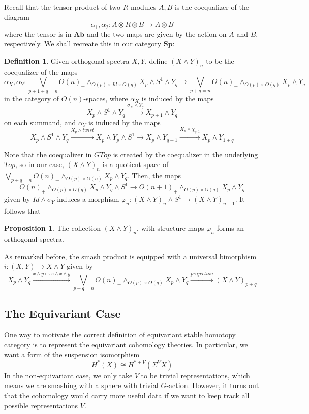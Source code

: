 \documentclass{article}
\theoremstyle{definition}
\theoremstyle{definition}
\newtheorem{definition}{Definition}[theorem]
\theoremstyle{definition}
\theoremstyle{definition}
\newtheorem{proposition}{Proposition}[theorem]
\theoremstyle{definition}
\theoremstyle{definition}
\theoremstyle{definition}
\begin{document}
Recall that the tensor product of two $R$-modules $A,B$ is the coequalizer of the diagram 
\[\alpha_1,\alpha_2: A\otimes R\otimes B\to A\otimes B\]
where the tensor is in $\textbf{Ab}$ and the two maps are given by the action on $A$ and $B$, respectively. We shall recreate this in our category $\textbf{Sp}$:


\begin{tcolorbox}[colback=purple!5!white,colframe=purple!75!black]
\begin{definition}
Given orthogonal spectra $X,Y$, define $(X\wedge Y)_n$ to be the coequalizer of the maps
\[\alpha_X,\alpha_Y: \bigvee_{p+1+q=n}O(n)_+\wedge_{O(p)\times Id\times O(q)}X_p\wedge S^1\wedge Y_q\to  \bigvee_{p+q=n}O(n)_+\wedge_{O(p)\times O(q)}X_p\wedge Y_q\]
in the category of $O(n)$-spaces, where $\alpha_X$ is induced by the maps
\[X_p\wedge S^1\wedge Y_q\xrightarrow{\sigma_X\wedge Y_q} X_{p+1}\wedge Y_q\] on each summand, and $\alpha_Y$ is induced by the maps 
\[X_p\wedge S^1\wedge Y_q\xrightarrow{X_p\wedge twist}X_p\wedge Y_p\wedge S^1\to X_{p}\wedge Y_{q+1}\xrightarrow{X_p\wedge \chi_{q,1}} X_{p}\wedge Y_{1+q}\]
\end{definition}
\end{tcolorbox}
Note that the coequalizer in $GTop$ is created by the coequalizer in the underlying $Top$, so in our case, $(X\wedge Y)_n$ is a quotient space of 
$\bigvee_{p+q=n}O(n)_+\wedge_{O(p)\times O(n)}X_p\wedge Y_q$. Then, the maps 
\[O(n)_+\wedge_{O(p)\times O(q)}X_p\wedge Y_q\wedge S^1\to O(n+1)_+\wedge_{O(p)\times O(q)}X_p\wedge Y_q\]
given by $Id\wedge \sigma_Y$ induces a morphism $\varphi_n:(X\wedge Y)_n\wedge S^1\to (X\wedge Y)_{n+1}$. It follows that 

\begin{tcolorbox}[colback=blue!5!white,colframe=blue!30!white]
\begin{proposition}
The collection $(X\wedge Y)_n$, with structure maps $\varphi_n$ forms an orthogonal spectra. 
\end{proposition}
\end{tcolorbox}

As remarked before, the smash product is equipped with a universal bimorphism $i: (X,Y)\to X\wedge Y$ given by 
\[X_p\wedge Y_q\xrightarrow{x\wedge y\mapsto e\wedge x\wedge y} \bigvee_{p+q=n}O(n)_+\wedge_{O(p)\times O(q)}X_p\wedge Y_q\xrightarrow{projection} (X\wedge Y)_{p+q}\]

\subsection{The Equivariant Case}
One way to motivate the correct definition of equivariant stable homotopy category is to represent the equivariant cohomology theories. In particular, we want a form of the suspension isomorphism
\[H^*(X)\cong H^{*+V}(\Sigma^VX)\]
In the non-equivariant case, we only take $V$ to be trivial representations, which means we are smashing with a sphere with trivial $G$-action. However, it turns out that the cohomology would carry more useful data if we want to keep track all possible representations $V$. 
\end{document}
